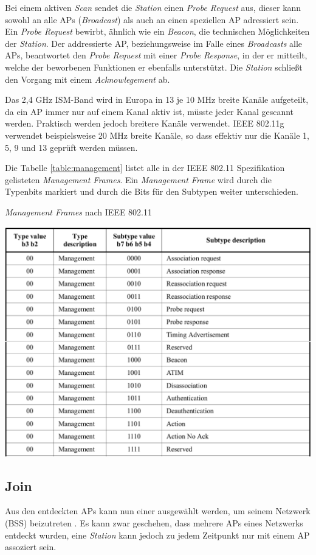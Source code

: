Bei einem aktiven \emph{Scan} sendet die \emph{Station} einen \emph{Probe Request} aus, dieser kann sowohl an alle APs (\emph{Broadcast}) als auch an einen speziellen AP adressiert sein.
Ein \emph{Probe Request} bewirbt, ähnlich wie ein \emph{Beacon}, die technischen Möglichkeiten der \emph{Station}.
Der addressierte AP, beziehungsweise im Falle eines \emph{Broadcasts} alle APs, beantwortet den \emph{Probe Request} mit einer \emph{Probe Response}, in der er mitteilt, welche der beworbenen Funktionen er ebenfalls unterstützt. 
Die \emph{Station} schließt den Vorgang mit einem \emph{Acknowlegement} ab. 

Das 2,4 GHz ISM-Band wird in Europa in 13 je 10 MHz breite Kanäle aufgeteilt, da ein AP immer nur auf einem Kanal aktiv ist, müsste jeder Kanal gescannt werden.
Praktisch werden jedoch breitere Kanäle verwendet. 
IEEE 802.11g verwendet beispielsweise 20 MHz breite Kanäle, so dass effektiv nur die Kanäle 1, 5, 9 und 13 geprüft werden müssen. 

Die Tabelle \ref{table:management} listet alle in der IEEE 802.11 Spezifikation gelisteten \emph{Management Frames}.
Ein \emph{Management Frame} wird durch die Typenbits markiert und durch die Bits für den Subtypen weiter unterschieden.

\begin{table}[h]
	\centering
	\caption{\emph{Management Frames} nach IEEE 802.11 \cite{ieee2012management}}
	\label{table:management}
\includegraphics[width=\textwidth]{images/managementframes.png}
\end{table}

\subsection{Join}
Aus den entdeckten APs kann nun einer ausgewählt werden, um seinem Netzwerk (BSS) beizutreten \cite{ieee2012join}.
Es kann zwar geschehen, dass mehrere APs eines Netzwerks entdeckt wurden, eine \emph{Station} kann jedoch zu jedem Zeitpunkt nur mit einem AP assoziert sein. 

